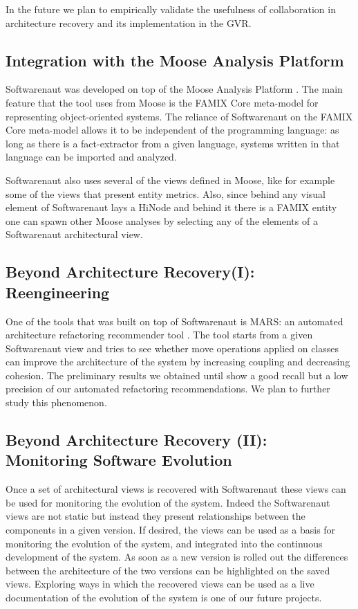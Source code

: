 \documentclass[preprint,12pt]{elsarticle}
\begin{document}
In the future we plan to empirically validate the usefulness of collaboration in architecture recovery and its implementation in the GVR.


\subsection {Integration with the Moose Analysis Platform}
Softwarenaut was developed on top of the Moose Analysis Platform \cite{nier-story}. The main feature that the tool uses from Moose is the FAMIX Core meta-model for representing object-oriented systems. The reliance of Softwarenaut on the FAMIX Core meta-model allows it to be independent of the programming language: as long as there is a fact-extractor from a given language, systems written in that language can be imported and analyzed. 

Softwarenaut also uses several of the views defined in Moose, like for example some of the views that present entity metrics. Also, since behind any visual element of Softwarenaut lays a HiNode and behind it there is a FAMIX entity one can spawn other Moose analyses by selecting any of the elements of a Softwarenaut architectural view. 



\subsection {Beyond Architecture Recovery(I): Reengineering}
One of the tools that was built on top of Softwarenaut is MARS: an automated architecture refactoring recommender tool \cite{}. The tool starts from a given Softwarenaut view and tries to see whether move operations applied on classes can improve the architecture of the system by increasing coupling and decreasing cohesion. The preliminary results we obtained until show a good recall but a low precision of our automated refactoring recommendations. We plan to further study this phenomenon.

\subsection {Beyond Architecture Recovery (II): Monitoring Software Evolution}
Once a set of architectural views is recovered with Softwarenaut these views can be used for monitoring the evolution of the system. Indeed the Softwarenaut views are not static but instead they present relationships between the components in a given version. If desired, the views can be used as a basis for monitoring the evolution of the system, and integrated into the continuous development of the system. As soon as a new version is rolled out the differences between the architecture of the two versions can be highlighted on the saved views. Exploring ways in which the recovered views can be used as a live documentation of the evolution of the system is one of our future projects.
\end{document}
